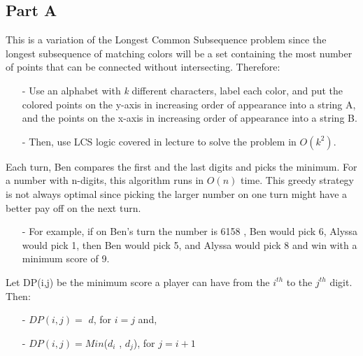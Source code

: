 \documentclass[12pt,twoside]{article}
\begin{document}

\begin{problems}

\section*{Part A}

\problem  %
This is a variation of the Longest Common Subsequence problem since the longest subsequence of matching colors will be a set containing the most number of points that can be connected without intersecting. Therefore: 
\begin{itemize}
	\item[-] Use an alphabet with \textit{k} different characters, label each color, and put the colored points on the y-axis in increasing order of appearance into a string A, and the points on the x-axis in increasing order of appearance into a string B. 	
	\item[-] Then, use LCS logic covered in lecture to solve the problem in $O(k^2)$. 
\end{itemize}

\problem 
\begin{problemparts}
\problempart Each turn, Ben compares the first and the last digits and picks the minimum. For a number with n-digits, this algorithm runs in $O(n)$ time. This greedy strategy is not always optimal since picking the larger number on one turn might have a better pay off on the next turn. 
\begin{itemize}
	\item[-] For example, if on Ben's turn the number is 6158 , Ben would pick 6, Alyssa would pick 1, then Ben would pick 5, and Alyssa would pick 8 and win with a minimum score of 9.
\end{itemize}
\problempart 
Let DP(i,j) be the minimum score a player can have from the $i^{th}$ to the $j^{th}$ digit. Then:
 \begin{itemize}
 	\item[-] $ DP(i,j) = $ $d$,  for $i=j $ and, 
 	\item [- ] $ DP(i,j)= Min $($d_{i}$ , $d_{j}$), for  $j=i+1 $
 \end{itemize}


\end{problemparts}
\end{problems}
\end{document}
